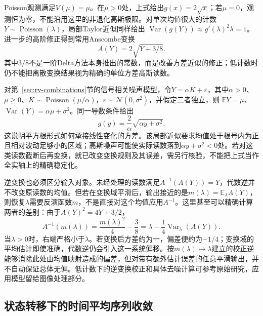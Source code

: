 Poisson观测满足\(V(\mu)=\mu\)。在\(\mu>0\)处，上式给出\(g(x)=2\sqrt x\)；若\(\mu=0\)，观测恒为零，不能沿用这里的非退化高斯极限。对单次均值很大的计数\(Y\sim\operatorname{Poisson}(\lambda)\)，局部Taylor近似同样给出
\(\operatorname{Var}(g(Y))\approx g'(\lambda)^2\lambda=1\)。进一步的高阶修正得到常用Anscombe变换
\[
 A(Y)=2\sqrt{Y+3/8}.
\]
其中\(3/8\)不是一阶Delta方法本身推出的常数，而是改善方差近似的修正；低计数时仍不能把离散变换结果视为精确的单位方差高斯读数。

对第~\ref{sec:rv-combinations}节的信号相关噪声模型，令\(Y=\alpha K+\varepsilon\)，其中\(\alpha>0\)、\(\mu\geq0\)、\(K\sim\operatorname{Poisson}(\mu/\alpha)\)，\(\varepsilon\sim\mathcal N(0,\sigma^2)\)，并假定二者独立，则
\(\mathbb EY=\mu\)、\(\operatorname{Var}(Y)=\alpha\mu+\sigma^2\)。同一导数条件给出
\[
 g(y)=\frac2\alpha\sqrt{\alpha y+\sigma^2}.
\]
这说明平方根形式如何承接线性变化的方差。该局部近似要求均值处于根号内为正且相对波动足够小的区域；高斯噪声可能使实际读数落到\(\alpha y+\sigma^2<0\)处。若对这类读数截断后再变换，就已改变变换规则及其误差，需另行核验，不能把上式当作全实轴上的精确稳定化。

逆变换也必须区分输入对象。未经处理的读数满足\(A^{-1}(A(Y))=Y\)，代数逆并不改变原读数的均值。但若在变换域平滑后，输出接近的是\(m(\lambda)=\mathbb E_\lambda A(Y)\)，则恢复\(\lambda\)需要反演函数\(m\)，不是直接对这个均值应用\(A^{-1}\)。这里甚至可以精确计算两者的差别：由于\(A(Y)^2=4Y+3/2\)，
\begin{equation}
 A^{-1}(m(\lambda))
 =\frac{m(\lambda)^2}{4}-\frac38
 =\lambda-\frac14\operatorname{Var}_\lambda(A(Y)).
 \label{eq:stoch-anscombe-inverse-bias}
\end{equation}
当\(\lambda>0\)时，右端严格小于\(\lambda\)。若变换后方差约为一，偏差便约为\(-1/4\)；变换域的平均估计即使准确，代数逆仍会引入这一系统偏移。按\(m(\lambda)\mapsto\lambda\)建立的校正逆能够消除此处由均值映射造成的偏差，但对带有额外估计误差的任意平滑输出，并不自动保证总体无偏。低计数下的逆变换校正和具体去噪计算可参考原始研究，应用模型留给图像处理部分。

\subsection{状态转移下的时间平均序列收敛}
\label{sec:stoch-markov-long-run-average}

